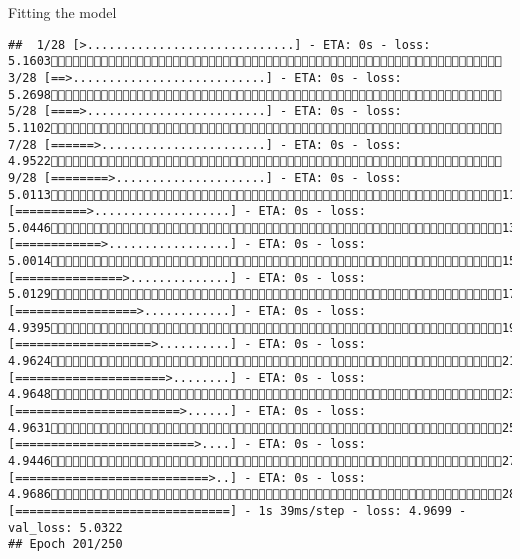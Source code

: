 \documentclass[
  ignorenonframetext,
]{beamer}
\begin{document}
\begin{frame}[fragile]{Fitting the model}
\begin{verbatim}
##  1/28 [>.............................] - ETA: 0s - loss: 5.1603 3/28 [==>...........................] - ETA: 0s - loss: 5.2698 5/28 [====>.........................] - ETA: 0s - loss: 5.1102 7/28 [======>.......................] - ETA: 0s - loss: 4.9522 9/28 [========>.....................] - ETA: 0s - loss: 5.011311/28 [==========>...................] - ETA: 0s - loss: 5.044613/28 [============>.................] - ETA: 0s - loss: 5.001415/28 [===============>..............] - ETA: 0s - loss: 5.012917/28 [=================>............] - ETA: 0s - loss: 4.939519/28 [===================>..........] - ETA: 0s - loss: 4.962421/28 [=====================>........] - ETA: 0s - loss: 4.964823/28 [=======================>......] - ETA: 0s - loss: 4.963125/28 [=========================>....] - ETA: 0s - loss: 4.944627/28 [===========================>..] - ETA: 0s - loss: 4.968628/28 [==============================] - 1s 39ms/step - loss: 4.9699 - val_loss: 5.0322
## Epoch 201/250

\end{verbatim}
\end{frame}
\end{document}
